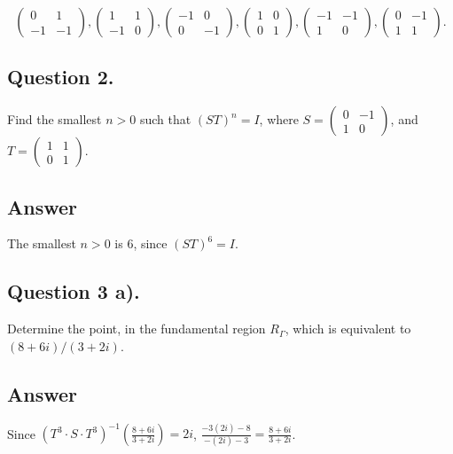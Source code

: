 \[
    \begin{pmatrix}
        0 & 1\\
        -1 & -1
    \end{pmatrix},
    \begin{pmatrix}
        1 & 1\\
        -1 & 0
    \end{pmatrix},
    \begin{pmatrix}
        -1 & 0\\
        0 & -1
    \end{pmatrix},
    \begin{pmatrix}
        1 & 0\\
        0 & 1
    \end{pmatrix},
    \begin{pmatrix}
        -1 & -1\\
        1 & 0
    \end{pmatrix},
    \begin{pmatrix}
        0 & -1\\
        1 & 1
    \end{pmatrix}.
\]


\subsection{Question 2.}
\noindent
Find the smallest $n>0$ such that $(ST)^n = I$, where
$S = \begin{pmatrix}
         0 & -1\\
          1 & 0 \end{pmatrix}$, and
$T = \begin{pmatrix}
         1 & 1\\
         0 & 1 \end{pmatrix}$.

\subsection*{Answer}
\noindent
The smallest $n>0$ is $6$, since $(ST)^6 = I$.


\subsection{Question 3 a).}
\noindent
Determine the point, in the fundamental region $R_\Gamma$, which is equivalent to $(8 + 6i)/(3 + 2i)$.

\subsection*{Answer}
\noindent
Since $(T^3\cdot S \cdot T^3)^{-1}(\frac{8+6i}{3+2i})=2i$, $\frac{-3(2i)-8}{-(2i)-3} = \frac{8+6i}{3+2i}$.


